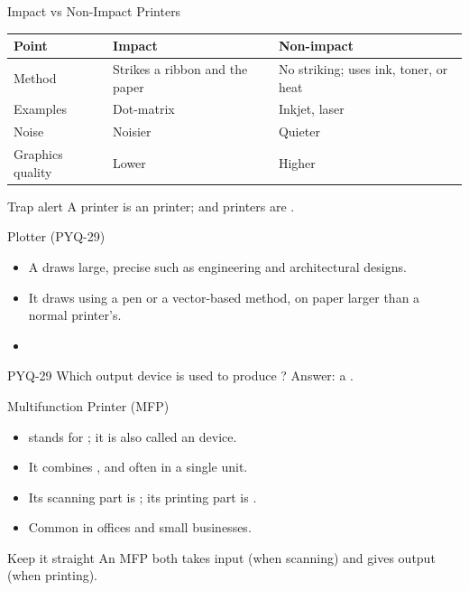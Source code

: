 \documentclass[aspectratio=169]{beamer}
\begin{document}
\begin{frame}{Impact vs Non-Impact Printers}
  \begin{center}
    \begin{tabular}{p{}p{}p{}}
      \toprule
      \textbf{Point} & \textbf{Impact} & \textbf{Non-impact} \\
      \midrule
      Method & Strikes a ribbon and the paper & No striking; uses ink, toner, or heat \\
      Examples & Dot-matrix & Inkjet, laser \\
      Noise & Noisier & Quieter \\
      Graphics quality & Lower & Higher \\
      \bottomrule
    \end{tabular}
  \end{center}
  \vspace{0.2cm}
  \begin{alertblock}{Trap alert}
    A  printer is an  printer;  and
     printers are .
  \end{alertblock}
\end{frame}

\begin{frame}{Plotter (PYQ-29)}
  \begin{itemize}
    \item A  draws large, precise  such as
      engineering and architectural designs.
    \item It draws using a pen or a vector-based method, on paper larger than
      a normal printer's.
    \item {}
  \end{itemize}
  \begin{exampleblock}{PYQ-29}
    Which output device is used to produce ?
    Answer: a .
  \end{exampleblock}
\end{frame}

\begin{frame}{Multifunction Printer (MFP)}
  \begin{itemize}
    \item {} stands for ; it is also called
      an  device.
    \item It combines , and often
       in a single unit.
    \item Its scanning part is ; its printing part is
      .
    \item Common in offices and small businesses.
  \end{itemize}
  \begin{block}{Keep it straight}
    An MFP both takes input (when scanning) and gives output (when printing).
  \end{block}
\end{frame}
\end{document}
